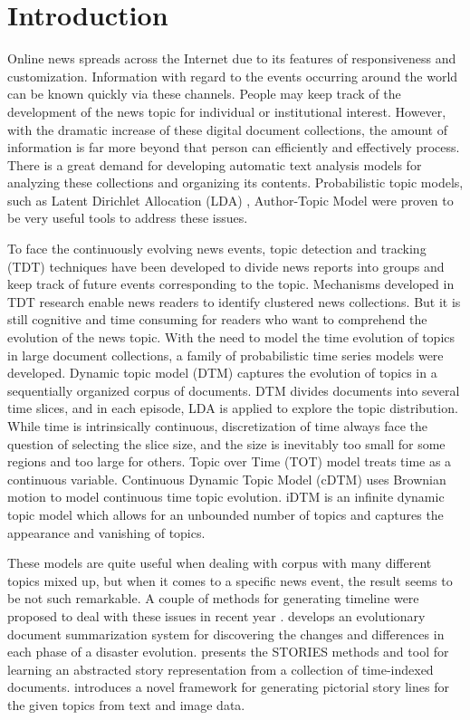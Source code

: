 \documentclass[runningheads,a4paper]{llncs}
\begin{document}
\section{Introduction}
\label{Introduction}
Online news spreads across the Internet due to its features of responsiveness and customization. Information with regard to the events occurring around the world can be known quickly via these channels. People may keep track of the development of the news topic for individual or institutional interest. However, with the dramatic increase of these digital document collections, the amount of information is far more beyond that person can efficiently and effectively process. There is a great demand for developing automatic text analysis models for analyzing these collections and organizing its contents. Probabilistic topic models, such as Latent Dirichlet Allocation (LDA) \cite{Blei:2003}, Author-Topic Model \cite{rosen2004author} were proven to be very useful tools to address these issues.

To face the continuously evolving news events, topic detection and tracking (TDT) \cite{allan2002introduction} techniques have been developed to divide news reports into groups and keep track of future events corresponding to the topic. Mechanisms developed in TDT research enable news readers to identify clustered news collections. But it is still cognitive and time consuming for readers who want to comprehend the evolution of the news topic. With the need to model the time evolution of topics in large document collections, a family of probabilistic time series models were developed. Dynamic topic model (DTM) \cite{Blei:2006} captures the evolution of topics in a sequentially organized corpus of documents. DTM divides documents into several time slices, and in each episode, LDA is applied to explore the topic distribution. While time is intrinsically continuous, discretization of time always face the question of selecting the slice size, and the size is inevitably too small for some regions and too large for others. Topic over Time (TOT) \cite{wang2006topics} model treats time as a continuous variable. Continuous Dynamic Topic Model (cDTM) \cite{wang2008continuous} uses Brownian motion to model continuous time topic evolution. iDTM \cite{ahmed2012timeline} is an infinite dynamic topic model which allows for an unbounded number of topics and captures the appearance and vanishing of topics.

These models are quite useful when dealing with corpus with many different topics mixed up, but when it comes to a specific news event, the result seems to be not such remarkable. A couple of methods for generating timeline were proposed to deal with these issues in recent year \cite{tang2013discovery} \cite{zehnalova2012evolution} \cite{lin2012generating}.  \cite{wang2009evolutionary} develops an evolutionary document summarization system for discovering the changes and differences in each phase of a disaster evolution. \cite{berendt2009stories} presents the STORIES methods and tool for learning an abstracted story representation from a collection of time-indexed documents. \cite{wang2012generating} introduces a novel framework for generating pictorial story lines for the given topics from text and image data.
\end{document}
